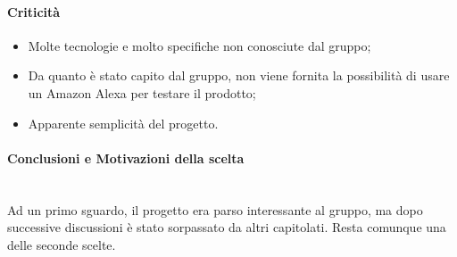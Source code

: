 \paragraph{Criticità}
\begin{itemize}
	\item Molte tecnologie e molto specifiche non conosciute dal gruppo;
	\item Da quanto è stato capito dal gruppo, non viene fornita la possibilità di usare un Amazon Alexa per testare il prodotto;
	\item Apparente semplicità del progetto.
\end{itemize}

\paragraph{Conclusioni e Motivazioni della scelta}\-\\
Ad un primo sguardo, il progetto era parso interessante al gruppo, ma dopo successive discussioni è stato sorpassato da altri capitolati. Resta comunque una delle seconde scelte.